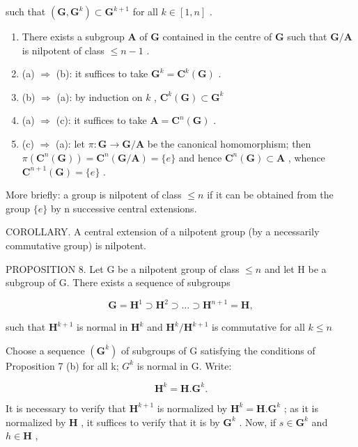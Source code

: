 such that \((\mathbf{G},\mathbf{G}^k)\subset \mathbf{G}^{k + 1}\) for all \(k\in [1,n]\) .

\begin{enumerate}
\def\labelenumi{(\alph{enumi})}
\setcounter{enumi}{2}
\item
  There exists a subgroup \(\mathbf{A}\) of \(\mathbf{G}\) contained in the centre of \(\mathbf{G}\) such that \(\mathbf{G} / \mathbf{A}\) is nilpotent of class \(\leqslant n - 1\) .
\item
  (a) \(\Rightarrow\) (b): it suffices to take \(\mathbf{G}^k = \mathbf{C}^k (\mathbf{G})\) .
\item
  (b) \(\Rightarrow\) (a): by induction on \(k\) , \(\mathbf{C}^k (\mathbf{G})\subset \mathbf{G}^k\)
\item
  (a) \(\Rightarrow\) (c): it suffices to take \(\mathbf{A} = \mathbf{C}^n (\mathbf{G})\) .
\item
  (c) \(\Rightarrow\) (a): let \(\pi: \mathbf{G} \to \mathbf{G} / \mathbf{A}\) be the canonical homomorphism; then \(\pi(\mathbf{C}^n(\mathbf{G})) = \mathbf{C}^n(\mathbf{G} / \mathbf{A}) = \{e\}\) and hence \(\mathbf{C}^n(\mathbf{G}) \subset \mathbf{A}\) , whence \(\mathbf{C}^{n+1}(\mathbf{G}) = \{e\}\) .
\end{enumerate}

More briefly: a group is nilpotent of class \(\leqslant n\) if it can be obtained from the group \(\{e\}\) by n successive central extensions.

COROLLARY. A central extension of a nilpotent group (by a necessarily commutative group) is nilpotent.

PROPOSITION 8. Let G be a nilpotent group of class \(\leqslant n\) and let H be a subgroup of G. There exists a sequence of subgroups

\[
\mathbf {G} = \mathbf {H} ^ {1} \supset \mathbf {H} ^ {2} \supset \dots \supset \mathbf {H} ^ {n + 1} = \mathbf {H},
\]

such that \(\mathbf{H}^{k + 1}\) is normal in \(\mathbf{H}^k\) and \(\mathbf{H}^k /\mathbf{H}^{k + 1}\) is commutative for all \(k\leqslant n\)

Choose a sequence \((\mathbf{G}^{k})\) of subgroups of G satisfying the conditions of Proposition 7 (b) for all k; \(G^{k}\) is normal in G. Write:

\[
\mathbf {H} ^ {k} = \mathbf {H}. \mathbf {G} ^ {k}.
\]

It is necessary to verify that \(\mathbf{H}^{k + 1}\) is normalized by \(\mathbf{H}^k = \mathbf{H}.\mathbf{G}^k\) ; as it is normalized by \(\mathbf{H}\) , it suffices to verify that it is by \(\mathbf{G}^k\) . Now, if \(s\in \mathbf{G}^k\) and \(h\in \mathbf{H}\) ,

